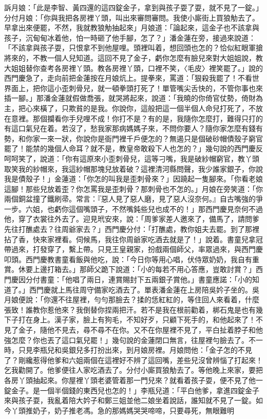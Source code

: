 訴月娘：「此是李智、黃四還的這四錠金子，拿到與孩子耍了耍，就不見了一錠。」分付月娘：「你與我把各房裡丫頭，叫出來審問審問。我使小廝街上買狼觔去了。早拿出來便罷，不然，我就教狼觔抽起來」月娘道：「論起來，這金子也不該拿與孩子，沉甸甸冰着他，怕一時砸了他手腳，怎了？」潘金蓮在旁，接過來說道：「不該拿與孩子耍，只恨拿不到他屋哩。頭裡叫着，想回頭也怎的？恰似紅眼軍搶將來的，不教一個人兒知道。這回不見了金子，虧你怎麼有臉兒來對大姐姐說，教大姐姐替你查考各房裡丫頭。教各房裡丫頭，口裡不笑，〈毛皮〉裡笑罷了。」說的西門慶急了，走向前把金蓮按在月娘炕上。提拳來，罵道：「狠殺我罷了！不看世界面上，把你這小歪刺骨兒，就一頓拳頭打死了！單管嘴尖舌快的，不管你事也來插一腳。」那潘金蓮就假做喬張，就哭將起來，說道：「我曉的你倚官仗勢，倚財為主，把心來橫了，只欺貧的是我。你說你，這般把這一個半個人命兒打死了，不放在意裡。那個攔看你手兒哩不成！你打不是？有的是，我隨你怎麼打，難得只打的有這口氣兒在着。若沒了，愁我家那病媽媽子來，不問你要人？隨你家怎麼有錢有勢，和你家一來一狀，你說你是衙門裡千戶便怎的？無遏只是個破砂帽債殼子窮官罷了！能禁的幾個人命耳？就不是，教皇帝敢殺下人也怎的？」幾句說的西門慶反呵呵笑了，說道：「你有這原來小歪刺骨兒，這等刁嘴，我是破紗帽窮官，教丫頭取笑我的紗帽來，我這紗帽那塊兒放着破？這裡清河縣問聲，我少誰家銀子，你說我是債殼子！」金蓮道：「你怎的叫我是歪刺骨來？」因蹺起一隻腳來。「你看老娘這腳！那些兒放着歪？你怎罵我是歪刺骨？那刺骨也不怎的。」月娘在旁笑道：「你兩個銅盆撞了鐵刷帚。常言：『惡人見了惡人磨，見了惡人沒奈何。』自古嘴強的爭一步。六姐，也虧你這個嘴頭子，不然嘴鈍些兒也成不的！」那西門慶見奈何不過他，穿了衣裳往外去了。迎見玳安來，說：「周爹家差人邀來了，備馬了，請問爹先往打醮處去？往周爺家去？」西門慶分付：「打醮處，教你姐夫去罷。到了那裡拈了香，快來家裡看。伺候馬，我往你周爺家吃酒去就是了！」說着。書童兒拿冠帶過來，打發穿了，繫上帶。只見王皇親家，扮戲兩個師父，率眾過來，與西門慶叩頭。西門慶教書童看飯與他吃，說：「今日你等用心唱，伏侍眾奶奶，我自有重賞。休要上邊打箱去。」那師父跪下說道：「小的每若不用心答應，豈敢討賞？」西門慶因分付書童：「他唱了兩日，連賞賜封下五兩銀子賞他。」書童應諾：「小的知道了。」西門慶就上馬往周守備家吃酒去了。單表潘金蓮在上房陪吳妗子坐的。吳月娘便說：「你還不往屋裡，勻勻那臉去？揉的恁紅紅的，等住回人來看着，什麼張致！誰教你惹他來？我倒替你捏兩把汗。若不是我在根前勸着，梆石鬼是也有幾下子打在身上。漢子家，臉上有狗毛，不知好歹，只顧下死手的，和他起來了！不見了金子，隨他不見去，尋不尋不在你。又不在你屋裡不見了，平白扯着脖子和他強怎麼？你也丟了這口氣兒罷！」幾句說的金蓮閉口無言，往屋裡勻臉去了。不一時，只見李瓶兒和吳銀兒多打扮出來，到月娘房裡。月娘問他：「金子怎的不見了？剛纔惹得他爹和六姐兩個在這裡好不辨了這回嘴，差些兒沒曾辨惱了打起來！乞我勸開了。他爹便往人家吃酒去了。分付小廝買狼觔去了。等他晚上來家，要把各房丫頭抽起來。你屋裡丫頭老婆管着那一門兒來？就看着孩子耍，便不見了他一錠金子。是一個半個錢的東西兒也怎的！」李瓶兒道：「平白他爹，拿進四錠金子來與孩子耍，我亂着陪大妗子和鄭三姐並他二娘坐着說話，誰知就不見了一錠。如今丫頭推奶子，奶子推老馮。急的那媽媽哭哭啼啼，只要尋死，無眼難明